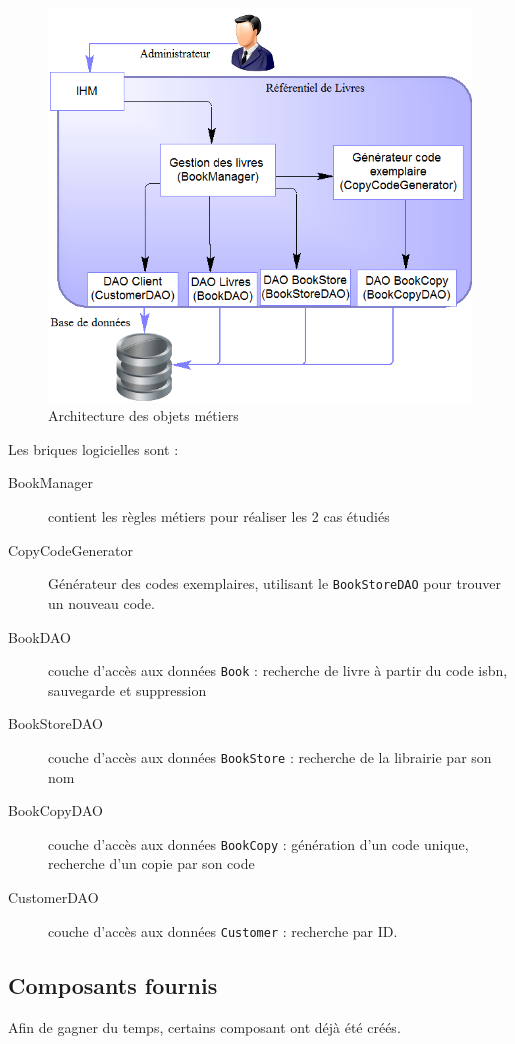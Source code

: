 \documentclass[small,algo]{dushClass}
\begin{document}
\begin{figure}[ht]\label{tp-spring-soc}
	\center
	\includegraphics{images/tp-spring-soc.png}
	\caption{Architecture des objets métiers}
\end{figure}

Les briques logicielles sont :
\begin{description}
\item[BookManager] contient les règles métiers pour réaliser les 2 cas étudiés
\item[CopyCodeGenerator] Générateur des codes exemplaires, utilisant le \texttt{BookStoreDAO} pour trouver un nouveau code.
\item[BookDAO] couche d'accès aux données \texttt{Book} : recherche de livre à partir du code isbn, sauvegarde et suppression
\item[BookStoreDAO] couche d'accès aux données \texttt{BookStore} : recherche de la librairie par son nom
\item[BookCopyDAO] couche d'accès aux données \texttt{BookCopy} : génération d'un code unique, recherche d'un copie par son code
\item[CustomerDAO] couche d'accès aux données \texttt{Customer} : recherche par ID.
\end{description}


\subsection{Composants fournis}
Afin de gagner du temps, certains composant ont déjà été créés.
\end{document}
